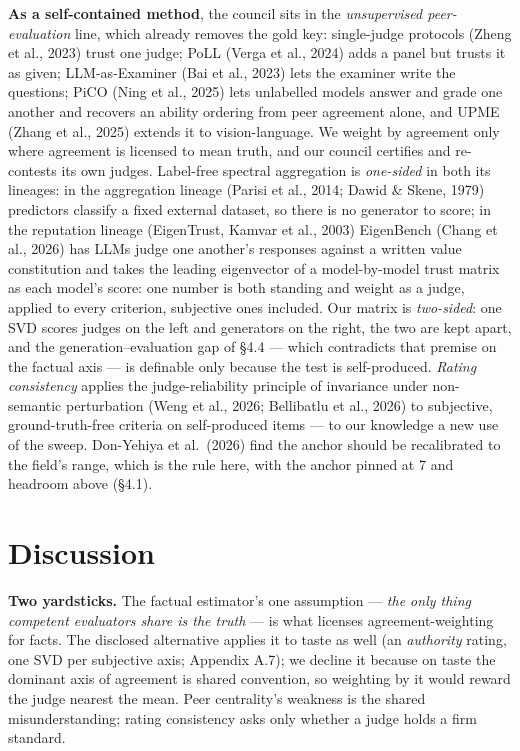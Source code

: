 \documentclass{article}
\begin{document}
\textbf{As a self-contained method}, the council sits in the \emph{unsupervised peer-evaluation} line, which already removes the gold key: single-judge protocols (Zheng et al., 2023) trust one judge; PoLL (Verga et al., 2024) adds a panel but trusts it as given; LLM-as-Examiner (Bai et al., 2023) lets the examiner write the questions; PiCO (Ning et al., 2025) lets unlabelled models answer and grade one another and recovers an ability ordering from peer agreement alone, and UPME (Zhang et al., 2025) extends it to vision-language. We weight by agreement only where agreement is licensed to mean truth, and our council certifies and re-contests its own judges. Label-free spectral aggregation is \emph{one-sided} in both its lineages: in the aggregation lineage (Parisi et al., 2014; Dawid \& Skene, 1979) predictors classify a fixed external dataset, so there is no generator to score; in the reputation lineage (EigenTrust, Kamvar et al., 2003) EigenBench (Chang et al., 2026) has LLMs judge one another's responses against a written value constitution and takes the leading eigenvector of a model-by-model trust matrix as each model's score: one number is both standing and weight as a judge, applied to every criterion, subjective ones included. Our matrix is \emph{two-sided}: one SVD scores judges on the left and generators on the right, the two are kept apart, and the generation--evaluation gap of \S{}4.4 --- which contradicts that premise on the factual axis --- is definable only because the test is self-produced. \emph{Rating consistency} applies the judge-reliability principle of invariance under non-semantic perturbation (Weng et al., 2026; Bellibatlu et al., 2026) to subjective, ground-truth-free criteria on self-produced items --- to our knowledge a new use of the sweep. Don-Yehiya et al.~(2026) find the anchor should be recalibrated to the field's range, which is the rule here, with the anchor pinned at 7 and headroom above (\S{}4.1).

\section{Discussion}\label{discussion}

\textbf{Two yardsticks.} The factual estimator's one assumption --- \emph{the only thing competent evaluators share is the truth} --- is what licenses agreement-weighting for facts. The disclosed alternative applies it to taste as well (an \emph{authority} rating, one SVD per subjective axis; Appendix A.7); we decline it because on taste the dominant axis of agreement is shared convention, so weighting by it would reward the judge nearest the mean. Peer centrality's weakness is the shared misunderstanding; rating consistency asks only whether a judge holds a firm standard.
\end{document}
